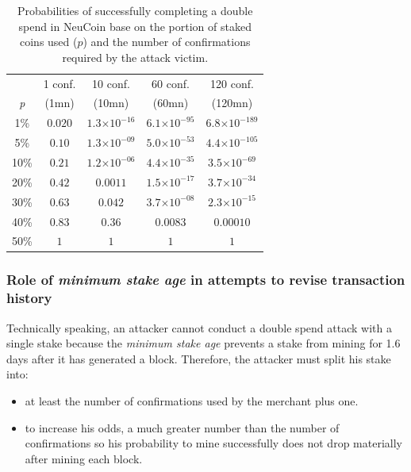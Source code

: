 \documentclass[a4paper,11pt]{article}
\providecommand{\e}[1]{\ensuremath{\times 10^{#1}}}
\begin{document}
\vspace{2mm}

\begin{table}[htp]
	\begin{center}
		\begin{tabular}{ccccc}
		\toprule
			{} & {1 conf.} & {10 conf.} & {60 conf.} & {120 conf.}\\
			{\textit{p}} & {(1mn)} & {(10mn)} & {(60mn)} & {(120mn)}\\
			\midrule
			1\% & $0.020$ & $1.3\e{-16}$ & $6.1\e{-95}$ & $6.8\e{-189}$\\
			5\% & $0.10$ & $1.3\e{-09}$ & $5.0\e{-53}$ & $4.4\e{-105}$\\
			10\% & $0.21$ & $1.2\e{-06}$ & $4.4\e{-35}$ & $3.5\e{-69}$\\
			20\% & $0.42$ & $0.0011$ & $1.5\e{-17}$ & $3.7\e{-34}$\\
			30\% & $0.63$ & $0.042$ & $3.7\e{-08}$ & $2.3\e{-15}$\\
			40\% & $0.83$ & $0.36$ & $0.0083$ & $0.00010$\\
			50\% & $1$ & $1$ & $1$ & $1$\\
		\bottomrule
		\end{tabular}
		\caption{Probabilities of successfully completing a double spend in NeuCoin base on the portion of staked coins used ($p$) and the number of confirmations required by the attack victim.}
	\end{center}
\end{table}

\subsubsection*{Role of \textit{minimum stake age} in attempts to revise transaction history}

Technically speaking, an attacker cannot conduct a double spend attack with a single stake because the \textit{minimum stake age} prevents a stake from mining for 1.6 days after it has generated a block. Therefore, the attacker must split his stake into:
\begin{itemize}
\setlength{\itemsep}{0pt}
\item{at least the number of confirmations used by the merchant plus one.}
\item{to increase his odds, a much greater number than the number of confirmations so his probability to mine successfully does not drop materially after mining each block.}
\end{itemize}
\end{document}
